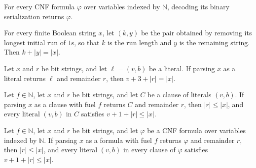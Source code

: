 \begin{theorem}
\label{Std.Sat.CNF.decode_serialize}
\leanok
{}
For every CNF formula $\varphi$ over variables indexed by $\mathbb{N}$, decoding its
binary serialization returns $\varphi$.
\end{theorem}

\begin{theorem}
\label{Std.Sat.CNF.takeTrues_length}
\leanok
{}
For every finite Boolean string $x$, let $(k,y)$ be the pair obtained by removing its
longest initial run of $1$s, so that $k$ is the run length and $y$ is the remaining
string. Then $k+|y|=|x|$.
\end{theorem}

\begin{theorem}
\label{Std.Sat.CNF.parseLit_length}
\leanok
{}
Let $x$ and $r$ be bit strings, and let $\ell=(v,b)$ be a literal. If parsing $x$ as a
literal returns $\ell$ and remainder $r$, then $v+3+|r|=|x|$.
\end{theorem}

\begin{theorem}
\label{Std.Sat.CNF.parseClause_bounds}
\leanok
{}
Let $f\in\mathbb{N}$, let $x$ and $r$ be bit strings, and let $C$ be a clause of
literals $(v,b)$. If parsing $x$ as a clause with fuel $f$ returns $C$ and remainder
$r$, then $|r|\le |x|$, and every literal $(v,b)$ in $C$ satisfies $v+1+|r|\le |x|$.
\end{theorem}

\begin{theorem}
\label{Std.Sat.CNF.parseClauses_bounds}
\leanok
{}
Let $f\in\mathbb{N}$, let $x$ and $r$ be bit strings, and let $\varphi$ be a CNF formula
over variables indexed by $\mathbb{N}$. If parsing $x$ as a formula with fuel $f$
returns $\varphi$ and remainder $r$, then $|r|\le |x|$, and every literal $(v,b)$ in
every clause of $\varphi$ satisfies $v+1+|r|\le |x|$.
\end{theorem}

